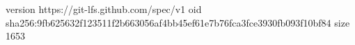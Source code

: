 version https://git-lfs.github.com/spec/v1
oid sha256:9fb625632f123511f2b663056af4bb45ef61e7b76fca3fce3930fb093f10bf84
size 1653
